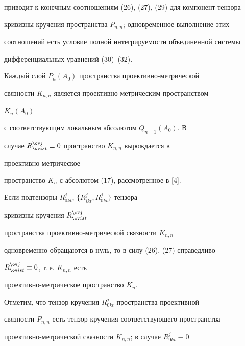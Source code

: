 приводит к конечным соотношениям (26), (27), (29) для компонент тензора 


кривизны-кручения пространства $P_{n,n}$; одновременное выполнение этих 


соотношений есть условие полной интегрируемости объединенной системы 


дифференциальных уравнений (30)--(32). 


 


 


\begin{note} 


Каждый слой $P_n(A_0)$ пространства проективно-метрической 


связности $K_{n,n}$ является проективно-метрическим пространством 


$K_n(A_0)$ 


с соответствующим локальным абсолютом $Q_{n-1}(A_0)$. В 


случае $R^{\ov j}_{\ov i st}\equiv0$ пространство $K_{n,n}$ вырождается в 


проективно-метрическое 


пространство $K_n$ с абсолютом (17), рассмотренное в [4]. 


\end{note} 


 


\begin{note} 


Если подтензоры $R^j_{0kt}$, $\{R^j_{ikt},R^j_{0kt}\}$ тензора 


кривизны-кручения $R^{\ov j}_{\ov i st}$ 


пространства проективно-метрической связности $K_{n,n}$ 


одновременно обращаются в нуль, то в силу (26), (27) справедливо 


$R^{\ov j}_{\ov i st}\equiv0$, т.\,е. $K_{n,n}$ есть 


проективно-метрическое пространство $K_n$. 


\end{note} 


 


Отметим, что тензор кручения $R^j_{0kt}$ пространства проективной 


связности $P_{n,n}$ есть тензор кручения соответствующего пространства 


проективно-метрической связности $K_{n,n}$; в случае $R^j_{0kt}\equiv0$ 


